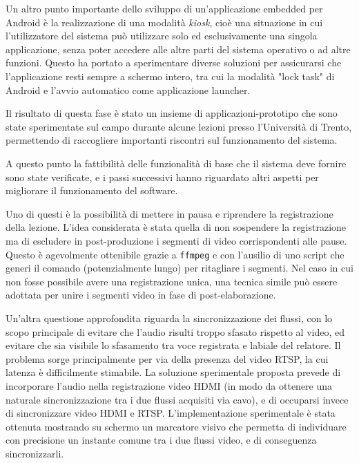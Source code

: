 Un altro punto importante dello sviluppo di un'applicazione embedded per Android è la realizzazione di una modalità \textit{kiosk}, cioè una situazione in cui l'utilizzatore del sistema può utilizzare solo ed esclusivamente una singola applicazione, senza poter accedere alle altre parti del sistema operativo o ad altre funzioni. Questo ha portato a sperimentare diverse soluzioni per assicurarsi che l'applicazione resti sempre a schermo intero, tra cui la modalità "lock task" di Android e l'avvio automatico come applicazione launcher.

Il risultato di questa fase è stato un insieme di applicazioni-prototipo che sono state sperimentate sul campo durante alcune lezioni presso l'Università di Trento, permettendo di raccogliere importanti riscontri sul funzionamento del sistema.

A questo punto la fattibilità delle funzionalità di base che il sistema deve fornire sono state verificate, e i passi successivi hanno riguardato altri aspetti per migliorare il funzionamento del software.

Uno di questi è la possibilità di mettere in pausa e riprendere la registrazione della lezione. L'idea considerata è stata quella di non sospendere la registrazione ma di escludere in post-produzione i segmenti di video corrispondenti alle pause. Questo è agevolmente ottenibile grazie a \texttt{ffmpeg} e con l'ausilio di uno script che generi il comando (potenzialmente lungo) per ritagliare i segmenti. Nel caso in cui non fosse possibile avere una registrazione unica, una tecnica simile può essere adottata per unire i segmenti video in fase di post-elaborazione.

Un'altra questione approfondita riguarda la sincronizzazione dei flussi, con lo scopo principale di evitare che l'audio risulti troppo sfasato rispetto al video, ed evitare che sia visibile lo sfasamento tra voce registrata e labiale del relatore. Il problema sorge principalmente per via della presenza del video RTSP, la cui latenza è difficilmente stimabile. La soluzione sperimentale proposta prevede di incorporare l'audio nella registrazione video HDMI (in modo da ottenere una naturale sincronizzazione tra i due flussi acquisiti via cavo), e di occuparsi invece di sincronizzare video HDMI e RTSP. L'implementazione sperimentale è stata ottenuta mostrando su schermo un marcatore visivo che permetta di individuare con precisione un instante comune tra i due flussi video, e di conseguenza sincronizzarli.

